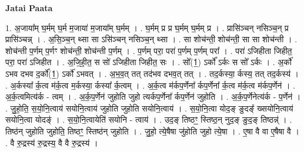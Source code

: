 \documentclass[17pt]{extarticle}
\begin{document}
\textbf{Jatai Paata} \newline

1. अ॒जाया᳚म् घ॒र्मम् घ॒र्म म॒जाया॑ म॒जाया᳚म् घ॒र्मम् । . घ॒र्मम् प्र प्र घ॒र्मम् घ॒र्मम् प्र । . प्रासि॑ञ्चन् नसिञ्च॒न् प्र प्रासि॑ञ्चन्न् । . अ॒सि॒ञ्च॒न् थ्सा सा ऽसि॑ञ्चन् नसिञ्च॒न् थ्सा । . सा शोच॑न्ती॒ शोच॑न्ती॒ सा सा शोच॑न्ती । . शोच॑न्ती प॒र्णम् प॒र्णꣳ शोच॑न्ती॒ शोच॑न्ती प॒र्णम् । . प॒र्णम् परा॒ परा॑ प॒र्णम् प॒र्णम् परा᳚ । . परा॑ ऽजिहीता जिहीत॒ परा॒ परा॑ ऽजिहीत । . अ॒जि॒ही॒त॒ स सो॑ ऽजिहीता जिहीत॒ सः । . सो᳚(1॒) ऽर्को᳚ ऽर्कः स सो᳚ ऽर्कः । . अ॒र्को॑ ऽभव दभव द॒र्को᳚(1॒) ऽर्को॑ ऽभवत् । . अ॒भ॒व॒त् तत् तद॑भव दभव॒त् तत् । . तद॒र्कस्या॒ र्कस्य॒ तत् तद॒र्कस्य॑ । . अ॒र्कस्या᳚ र्क॒त्व म॑र्क॒त्व म॒र्कस्या॒ र्कस्या᳚ र्क॒त्वम् । . अ॒र्क॒त्व म॑र्कप॒र्णेना᳚ र्कप॒र्णेना᳚ र्क॒त्व म॑र्क॒त्व म॑र्कप॒र्णेन॑ । . अ॒र्क॒त्वमित्य॑र्क - त्वम् । . अ॒र्क॒प॒र्णेन॑ जुहोति जुहो त्यर्कप॒र्णेना᳚ र्कप॒र्णेन॑ जुहोति । . अ॒र्क॒प॒र्णेनेत्य॑र्क - प॒र्णेन॑ । . जु॒हो॒ति॒ स॒यो॒नि॒त्वाय॑ सयोनि॒त्वाय॑ जुहोति जुहोति सयोनि॒त्वाय॑ । . स॒यो॒नि॒त्वा योद॒ङ् ङुदङ्᳚ ख्सयोनि॒त्वाय॑ सयोनि॒त्वा योदङ्॑ । . स॒यो॒नि॒त्वायेति॑ सयोनि - त्वाय॑ । . उद॒ङ् तिष्ठꣳ॒॒ स्तिष्ठ॒न् नुद॒ङ् ङुद॒ङ् तिष्ठन्न्॑ । . तिष्ठ॑न् जुहोति जुहोति॒ तिष्ठꣳ॒॒ स्तिष्ठ॑न् जुहोति । . जु॒हो॒ त्ये॒षैषा जु॑होति जुहो त्ये॒षा । . ए॒षा वै वा ए॒षैषा वै । . वै रु॒द्रस्य॑ रु॒द्रस्य॒ वै वै रु॒द्रस्य॑ । \newline
\end{document}
